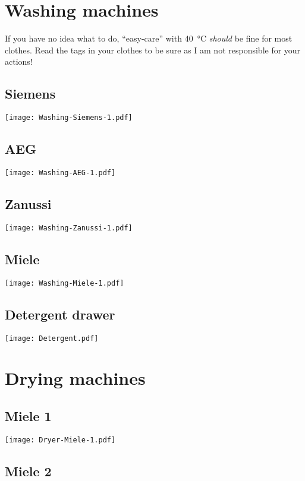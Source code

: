 \documentclass[11pt, english, fleqn, DIV=15, headinclude]{scrartcl}
\title{}
\author{
    Martin Ueding \\ \small{\href{mailto:mu@martin-ueding.de}{mu@martin-ueding.de}}
}
\begin{document}
\section*{Washing machines}

If you have no idea what to do, “easy-care” with \SI{40}{\celsius}
\emph{should} be fine for most clothes. Read the tags in your clothes to be
sure as I am not responsible for your actions!

\subsection*{Siemens}
\texttt{[image: Washing-Siemens-1.pdf]}

\subsection*{AEG}
\texttt{[image: Washing-AEG-1.pdf]}

\subsection*{Zanussi}
\texttt{[image: Washing-Zanussi-1.pdf]}

\subsection*{Miele}
\texttt{[image: Washing-Miele-1.pdf]}

\subsection*{Detergent drawer}

\texttt{[image: Detergent.pdf]}


\section*{Drying machines}

\subsection*{Miele 1}

\texttt{[image: Dryer-Miele-1.pdf]}

\subsection*{Miele 2}
\end{document}
